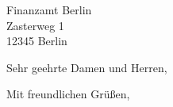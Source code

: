 \documentclass[12pt,ngerman]{scrlttr2}
\begin{document}
\begin{letter}{Finanzamt Berlin \\ Zasterweg 1 \\ 12345 Berlin}

\opening{Sehr geehrte Damen und Herren,}


\closing{Mit freundlichen Grüßen,}

\end{letter}
\end{document}
